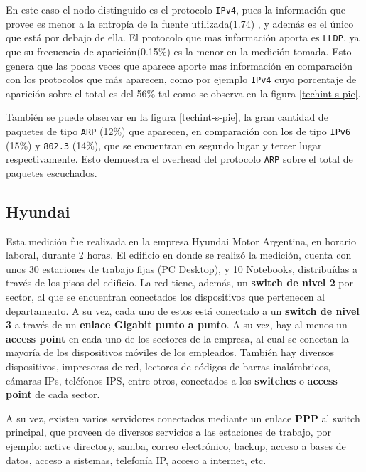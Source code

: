 \documentclass[final,inline,a4paper,narroweqnarray]{ieee}
\begin{document}
    En este caso el nodo distinguido es el protocolo \texttt{IPv4},
    pues la información que provee es menor a la entropía de la fuente
    utilizada(1.74) , y además es el único que está por debajo de
    ella. El protocolo que mas información aporta es \texttt{LLDP}, ya
    que su frecuencia de aparición(0.15\%) es la menor en la medición
    tomada. Esto genera que las pocas veces que aparece aporte mas
    información en comparación con los protocolos que más aparecen,
    como por ejemplo
    \texttt{IPv4} cuyo porcentaje de aparición sobre el total es del 56\%
    tal como se observa en la figura \ref{techint-s-pie}.

    También se puede observar en la figura \ref{techint-s-pie}, la
    gran cantidad de paquetes de tipo \texttt{ARP} (12\%) que
    aparecen, en comparación con los de tipo \texttt{IPv6} (15\%) y
    \texttt{802.3} (14\%), que se encuentran en segundo lugar y tercer
    lugar respectivamente. Esto demuestra el overhead del protocolo
    \texttt{ARP} sobre el total de paquetes escuchados.

  \subsection{Hyundai}

    Esta medición fue realizada en la empresa Hyundai Motor Argentina,
    en horario laboral, durante 2 horas. El edificio en donde se
    realizó la medición, cuenta con unos 30 estaciones de trabajo
    fijas (PC Desktop), y 10 Notebooks, distribuídas a través de los
    pisos del edificio. La red tiene, además, un \textbf{switch de
    nivel 2} por sector, al que se encuentran conectados los
    dispositivos que pertenecen al departamento. A su vez, cada uno de
    estos está conectado a un \textbf{switch de nivel 3} a través de
    un \textbf{enlace Gigabit punto a punto}. A su vez, hay al menos
    un \textbf{access point} en cada uno de los sectores de la
    empresa, al cual se conectan la mayoría de los dispositivos
    móviles de los empleados. También hay diversos dispositivos,
    impresoras de red, lectores de códigos de barras inalámbricos,
    cámaras IPs, teléfonos IPS, entre otros, conectados a los
    \textbf{switches} o \textbf{access point} de cada sector.

    A su vez, existen varios servidores conectados mediante un enlace
    \textbf{PPP} al switch principal, que proveen de diversos servicios a las
    estaciones de trabajo, por ejemplo: active directory, samba,
    correo electrónico, backup, acceso a bases de datos, acceso a
    sistemas, telefonía IP, acceso a internet, etc.
\end{document}
